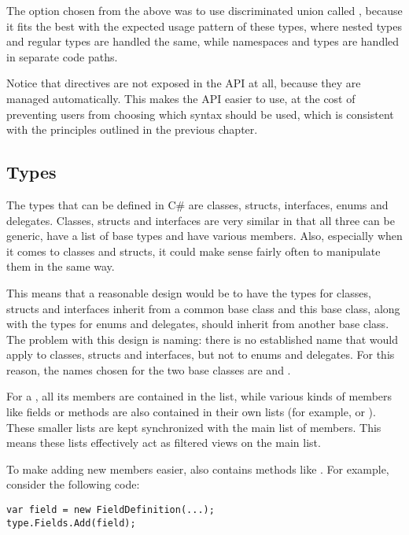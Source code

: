 The option chosen from the above was to use discriminated union  called , because it fits the best with the expected usage pattern of these types, where nested types and regular types are handled the same, while namespaces and types are handled in separate code paths.

\medskip

Notice that  directives are not exposed in the \ac{API} at all, because they are managed automatically. This makes the \ac{API} easier to use, at the cost of preventing users from choosing which syntax should be used, which is consistent with the principles outlined in the previous chapter.

\subsection{Types}

The types that can be defined in C\# are classes, structs, interfaces, enums and delegates. Classes, structs and interfaces are very similar in that all three can be generic, have a list of base types and have various members. Also, especially when it comes to classes and structs, it could make sense fairly often to manipulate them in the same way. 

This means that a reasonable design would be to have the types for classes, structs and interfaces inherit from a common base class and this base class, along with the types for enums and delegates, should inherit from another base class. The problem with this design is naming: there is no established name that would apply to classes, structs and interfaces, but not to enums and delegates. For this reason, the names chosen for the two base classes are  and .

\medskip

For a , all its members are contained in the  list, while various kinds of members like fields or methods are also contained in their own lists (for example,  or ). These smaller lists are kept synchronized with the main list of members. This means these lists effectively act as filtered views on the main list.

To make adding new members easier,  also contains methods like . For example, consider the following code:

\begin{verbatim}
var field = new FieldDefinition(...);
type.Fields.Add(field);
\end{verbatim}

